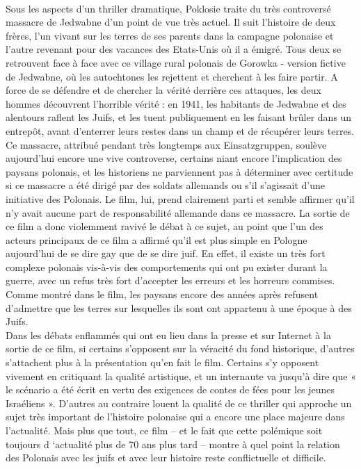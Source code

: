 \documentclass[12pt]{amsart}
\begin{document}
\paragraph{}
Sous les aspects d’un thriller dramatique, Poklosie traite du très controversé massacre de Jedwabne d’un point de vue très actuel. Il suit l’histoire de deux frères, l’un vivant sur les terres de ses parents dans la campagne polonaise et l’autre revenant pour des vacances des Etats-Unis où il a émigré. Tous deux se retrouvent face à face avec ce village rural polonais de Gorowka - version fictive de Jedwabne, où les autochtones les rejettent et cherchent à les faire partir. A force de se défendre et de chercher la vérité derrière ces attaques, les deux hommes découvrent l’horrible vérité : en 1941, les habitants de Jedwabne et des alentours raflent les Juifs, et les tuent publiquement en les faisant brûler dans un entrepôt, avant d’enterrer leurs restes dans un champ et de récupérer leurs terres. \\
Ce massacre, attribué pendant très longtemps aux  Einsatzgruppen, soulève aujourd’hui encore une vive controverse, certains niant encore l’implication des paysans polonais, et les historiens ne parviennent pas à déterminer avec certitude si ce massacre a été dirigé par des soldats allemands ou s’il s’agissait d’une initiative des Polonais. Le film, lui, prend clairement parti et semble affirmer qu’il n’y avait aucune part de responsabilité allemande dans ce massacre. La sortie de ce film a donc violemment ravivé le débat à ce sujet, au point que l’un des acteurs principaux de ce film a affirmé qu’il est plus simple en Pologne aujourd’hui de se dire gay que de se dire juif. En effet, il existe un très fort complexe polonais vis-à-vis des comportements qui ont pu exister durant la guerre, avec un refus très fort d’accepter les erreurs et les horreurs commises. Comme montré dans le film, les paysans encore des années après refusent d’admettre que les terres sur lesquelles ils sont ont appartenu à une époque à des Juifs. 
\\
Dans les débats enflammés qui ont eu lieu dans la presse et sur Internet à la sortie de ce film, si certains s’opposent sur la véracité du fond historique, d’autres s’attachent plus à la présentation qu’en fait le film. Certains s’y opposent vivement en critiquant la qualité artistique, et un internaute va jusqu’à dire que « le scénario a été écrit en vertu des exigences de contes de fées pour les jeunes Israéliens ». D’autres au contraire louent la qualité de ce thriller qui approche un sujet très important de l’histoire polonaise qui a encore une place majeure dans l’actualité. Mais plus que tout, ce film – et le fait que cette polémique soit toujours d ‘actualité plus de 70 ans plus tard – montre à quel point la relation des Polonais avec les juifs et avec leur histoire reste conflictuelle et difficile. 
\end{document}
